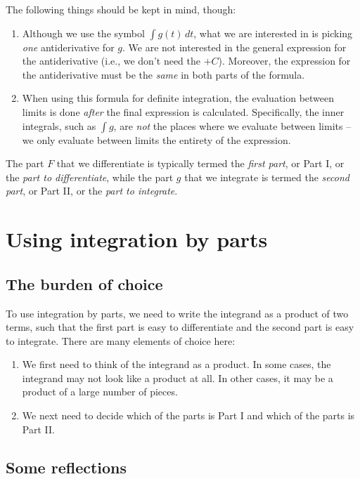 \documentclass{amsart}
\begin{document}
The following things should be kept in mind, though:

\begin{enumerate}
\item Although we use the symbol $\int g(t) \, dt$, what we are
  interested in is picking {\em one} antiderivative for $g$. We are
  not interested in the general expression for the antiderivative
  (i.e., we don't need the $+C$). Moreover, the expression for the
  antiderivative must be the {\em same} in both parts of the formula.
\item When using this formula for definite integration, the evaluation
  between limits is done {\em after} the final expression is
  calculated. Specifically, the inner integrals, such as $\int g$, are
  {\em not} the places where we evaluate between limits -- we only
  evaluate between limits the entirety of the expression.
\end{enumerate}

The part $F$ that we differentiate is typically termed the {\em first
part}, or Part I, or the {\em part to differentiate}, while the part
$g$ that we integrate is termed the {\em second part}, or Part II, or
the {\em part to integrate}.
\section{Using integration by parts}

\subsection{The burden of choice}

To use integration by parts, we need to write the integrand as a
product of two terms, such that the first part is easy to
differentiate and the second part is easy to integrate. There are many
elements of choice here:

\begin{enumerate}
\item We first need to think of the integrand as a product. In some
  cases, the integrand may not look like a product at all. In other
  cases, it may be a product of a large number of pieces.
\item We next need to decide which of the parts is Part I and which of
  the parts is Part II.
\end{enumerate}

\subsection{Some reflections}
\end{document}
